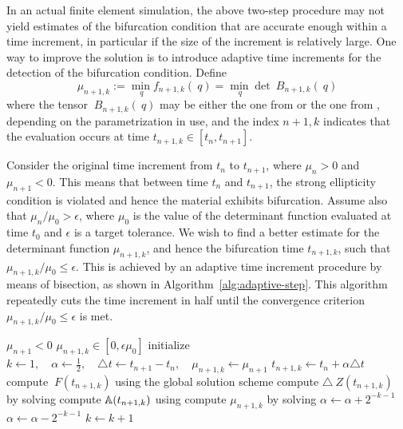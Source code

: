 \documentclass[12pt]{article}
\numberwithin{equation}{section}
\begin{document}
In an actual finite element simulation, the above two-step procedure
may not yield estimates of the bifurcation condition that are accurate
enough within a time increment, in particular if the size of the
increment is relatively large. One way to improve the solution is to
introduce adaptive time increments for the detection of the
bifurcation condition.  Define
\begin{equation} \label{eq:general-minimization-problem}
  \mu_{n+1,k} := \min_{~q} f_{n+1,k}(~q) = \min_{~q} \det ~B_{n+1,k}(~q)
\end{equation}
where the tensor $~B_{n+1,k}(~q)$ may be either the one from
 or the one from
, depending on the parametrization
in use, and the index ${n+1,k}$ indicates that the evaluation occurs
at time $t_{n+1,k} \in [t_n, t_{n+1}]$.

Consider the original time increment from $t_n$ to $t_{n+1}$, where
$\mu_n > 0$ and $\mu_{n+1} < 0$. This means that between time $t_n$
and $t_{n+1}$, the strong ellipticity condition is violated and hence
the material exhibits bifurcation. Assume also that $\mu_n / \mu_0 >
\epsilon$, where $\mu_0$ is the value of the determinant function
evaluated at time $t_0$ and $\epsilon$ is a target tolerance. We wish
to find a better estimate for the determinant function $\mu_{n+1,k}$,
and hence the bifurcation time $t_{n+1,k}$, such that $\mu_{n+1,k} /
\mu_0 \le \epsilon$. This is achieved by an adaptive time increment
procedure by means of bisection, as shown in
Algorithm~\ref{alg:adaptive-step}. This algorithm repeatedly cuts the
time increment in half until the convergence criterion $\mu_{n+1,k} /
\mu_0 \le \epsilon$ is met.

\begin{algorithm}[!htbp]
  \caption{$\text{AdaptiveStep}(\mu_0, \mu_{n+1}, t_{n+1}, \epsilon)$}
  \begin{algorithmic}
    \REQUIRE $\mu_{n+1} < 0$
    \ENSURE $\mu_{n+1,k} \in [0, \epsilon \mu_0]$
    \STATE initialize
    $k \leftarrow 1,
    \quad
    \alpha \leftarrow \frac{1}{2},
    \quad
    \triangle t \leftarrow t_{n+1} - t_n,
    \quad
    \mu_{n+1,k} \leftarrow \mu_{n+1}$
    \STATE $t_{n+1,k} \leftarrow t_n + \alpha \triangle t$
    \STATE compute $~F(t_{n+1,k})$ using the global solution scheme
    \STATE compute $\triangle ~Z(t_{n+1,k})$
    by solving 
    \STATE compute $\mathbb{A}(t_{n+1,k})$
    using 
    \STATE compute $\mu_{n+1,k}$
    by solving 
    \STATE $\alpha \leftarrow \alpha + 2^{-k-1}$
    \ELSE
    \STATE $\alpha \leftarrow \alpha - 2^{-k-1}$
    \ENDIF
    \STATE $k \leftarrow k+1$
    \ENDWHILE
  \end{algorithmic}
  \label{alg:adaptive-step}
\end{algorithm}
\end{document}
